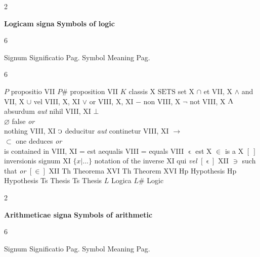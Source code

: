 \documentclass{book}
\newcommand{\s}{\switchcolumn} %
\newcommand{\C}{\mathop{\sbox0{$\displaystyle$$\reflectbox{C}$} %
\raisebox{-\height+\ht0-0.05cm}[\ht0][\dp0]{\scalebox{0.8}[0.8]{\copy0}}}\displaylimits} %
\newcommand{\abs}{\mathop{\rotatebox[origin=c]{180}{V}}}
\newcommand{\such}{\thinspace \rotatebox[origin=c]{180}{$\epsilon$}}
\newcommand{\smallIn}{\ensuremath{\mathrel{\epsilon}}}
\newcommand{\setOfSets}{\mathord{\text{SETS}}}
\newenvironment{translateTwoCol}
               { %
                 \columnratio{0.5, 0.5} \begin{paracol}{2}
                 \newcommand{\LAT}{\switchcolumn[0]*}
                 \newcommand{\ENG}{\switchcolumn[1]}
               }
               { %
                 \let\ENG\undefined
                 \let\LAT\undefined
                 \end{paracol}
               }
\newenvironment{translateSixCol}[6]
               { %
                 \setcolumnwidth{#1\fill/1em, #2\fill/1em, #3\fill/\columnsep, #4\fill/1em, #5\fill/1em, #6\fill}
                 \begin{paracol}{6}
               }
               { %
                 \end{paracol}
               }
\begin{document}
\begin{translateTwoCol}
\centering
\textbf{Logicam signa}
\ENG
\textbf{Symbols of logic}
\end{translateTwoCol}

\begin{translateSixCol}{0.05}{0.35}{0.1}{0.05}{0.35}{0.1}
\raggedright
Signum \s Significatio \s Pag.
\s Symbol \s Meaning \s Pag.
\end{translateSixCol}

\begin{translateSixCol}{0.06}{0.34}{0.1}{0.06}{0.34}{0.1}
\raggedright
$P$ \s propositio \s VII
\s $P$\# \s proposition \s VII
\s* $K$ \s classis \s X
\s $\setOfSets$ \s set \s X
\s* $\cap$ \s et \s VII, X
\s $\wedge$ \s and \s VII, X
\s* $\cup$ \s vel \s VIII, X, XI
\s $\vee$ \s or \s VIII, X, XI
\s* $-$ \s non \s VIII, X
\s $\neg$ \s not \s VIII, X
\s* $\abs$ \s absurdum \emph{aut} nihil \s VIII, XI
\s $\bot$ \\ $\varnothing$ \s false \emph{or} \\ \quad nothing \s VIII, XI
\s* $\C$ \s deducitur \emph{aut} continetur \s VIII, XI
\s $\rightarrow$ \\ $\subset$ \s one deduces \emph{or} \\ \quad is contained in \s VIII, XI
\s* = \s est aequalis \s VIII
\s = \s equals \s VIII
\s* $\smallIn$ \s est \s X
\s $\in$ \s is a \s X   %
\s* $[ \ ]$ \s inversionis signum \s XI
\s $\{ x | \ldots \}$ \s notation of the inverse \s XI  %
\s* \such \s qui \emph{vel} $[ \smallIn ]$ \s XII
\s $\ni$ \s such that \emph{or} $[ \in ]$ \s XII
\s* Th \s Theorema \s XVI
\s  Th \s Theorem \s XVI
\s* Hp \s Hypothesis \s
\s  Hp \s Hypothesis \s
\s* Ts \s Thesis \s
\s  Ts \s Thesis \s
\s* $L$ \s Logica \s
\s  $L$\# \s Logic \s
\end{translateSixCol}

\vspace{1em}
\begin{translateTwoCol}
\centering
\textbf{Arithmeticae signa}
\ENG
\textbf{Symbols of arithmetic}
\end{translateTwoCol}

\begin{translateSixCol}{0.05}{0.35}{0.1}{0.05}{0.35}{0.1}
\raggedright
Signum \s Significatio \s Pag.
\s Symbol \s Meaning \s Pag.
\end{translateSixCol}
\end{document}
